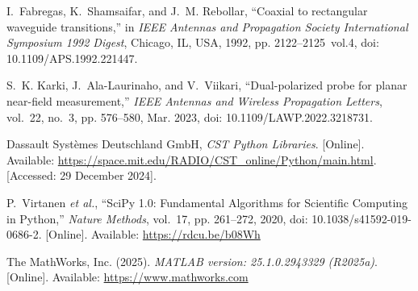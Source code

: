 \documentclass[journal,9pt]{IEEEtran}
\begin{document}
\begin{thebibliography}{99}
    I.~Fabregas, K.~Shamsaifar, and J.~M. Rebollar, ``Coaxial to rectangular waveguide transitions,'' in \emph{IEEE Antennas and Propagation Society International Symposium 1992 Digest}, Chicago, IL, USA, 1992, pp. 2122--2125~vol.4, doi: 10.1109/APS.1992.221447.

    S.~K. Karki, J.~Ala-Laurinaho, and V.~Viikari, ``Dual-polarized probe for planar near-field measurement,'' \emph{IEEE Antennas and Wireless Propagation Letters}, vol.~22, no.~3, pp. 576--580, Mar. 2023, doi: 10.1109/LAWP.2022.3218731.

    Dassault Syst\`emes Deutschland GmbH, \emph{CST Python Libraries}. [Online]. Available: \url{https://space.mit.edu/RADIO/CST_online/Python/main.html}. [Accessed: 29 December 2024].

    P.~Virtanen \emph{et al.}, ``SciPy 1.0: Fundamental Algorithms for Scientific Computing in Python,'' \emph{Nature Methods}, vol.~17, pp. 261--272, 2020, doi: 10.1038/s41592-019-0686-2. [Online]. Available: \url{https://rdcu.be/b08Wh}

    The MathWorks, Inc. (2025). \emph{MATLAB version: 25.1.0.2943329 (R2025a)}. [Online]. Available: \url{https://www.mathworks.com}
\end{thebibliography}
\end{document}
